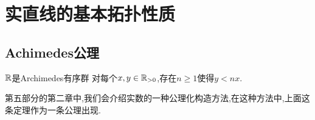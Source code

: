 \chapter{实直线的基本拓扑性质}

\section{Achimedes公理}

\begin{theorem}{$\mathbb{R}$是Archimedes有序群}{}
	对每个$x,y\in\mathbb{R}_{>0}$,存在$n\geq 1$使得$y<nx$.
\end{theorem}

\begin{remark}{}{}
	第五部分的第二章中,我们会介绍实数的一种公理化构造方法,在这种方法中,上面这条定理作为一条公理出现.
\end{remark}
















